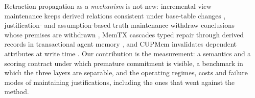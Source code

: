 Retraction propagation as a \emph{mechanism} is not new: incremental view maintenance keeps derived relations consistent under base-table changes \citep{gupta1993}, justification- and assumption-based truth maintenance withdraw conclusions whose premises are withdrawn \citep{doyle1979,dekleer1986}, MemTX cascades typed repair through derived records in transactional agent memory \citep{memtx2026}, and CUPMem invalidates dependent attributes at write time \citep{stale2026}. Our contribution is the measurement: a semantics and a scoring contract under which premature commitment is visible, a benchmark in which the three layers are separable, and the operating regimes, costs and failure modes of maintaining justifications, including the ones that went against the method.
